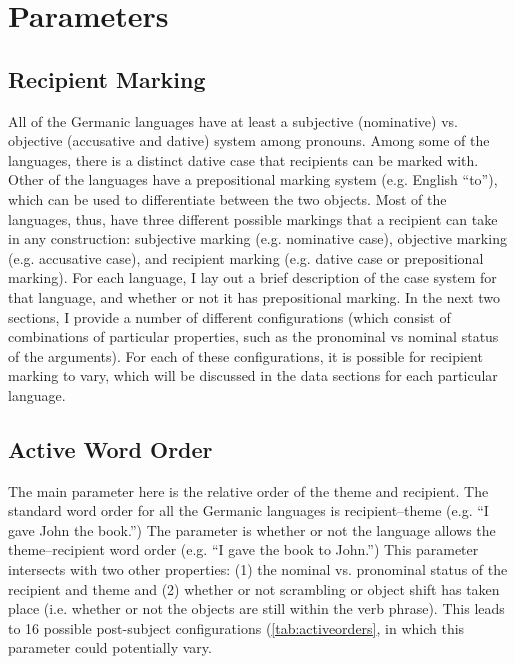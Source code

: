 \chapter{Parameters}

\section{Recipient Marking}\label{sec:marking}
All of the Germanic languages have at least a subjective (nominative) vs. objective (accusative and dative) system among pronouns. Among some of the languages, there is a distinct dative case that recipients can be marked with. Other of the languages have a prepositional marking system (e.g. English ``to''), which can be used to differentiate between the two objects. Most of the languages, thus, have three different possible markings that a recipient can take in any construction: subjective marking (e.g. nominative case), objective marking (e.g. accusative case), and recipient marking (e.g. dative case or prepositional marking). For each language, I lay out a brief description of the case system for that language, and whether or not it has prepositional marking. In the next two sections, I provide a number of different configurations (which consist of combinations of particular properties, such as the pronominal vs nominal status of the arguments). For each of these configurations, it is possible for recipient marking to vary, which will be discussed in the data sections for each particular language.

\section{Active Word Order}\label{sec:actwo}
The main parameter here is the relative order of the theme and recipient. The standard word order for all the Germanic languages is recipient--theme (e.g. ``I gave John the book.'') The parameter is whether or not the language allows the theme--recipient word order (e.g. ``I gave the book to John.'') This parameter intersects with two other properties: (1) the nominal vs. pronominal status of the recipient and theme and (2) whether or not scrambling or object shift has taken place (i.e. whether or not the objects are still within the verb phrase). This leads to 16 possible post-subject configurations (\ref{tab:activeorders}, in which this parameter could potentially vary.

